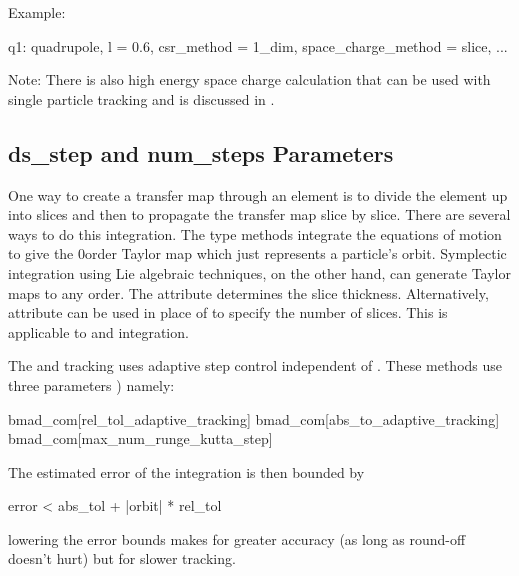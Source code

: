 Example:
\begin{example}
  q1: quadrupole, l = 0.6, csr_method = 1_dim, space_charge_method = slice, ...
\end{example}

Note: There is also high energy space charge calculation that can be used with single particle
tracking and is discussed in .

\subsection{ds_step and num_steps Parameters}
\label{s:ds.step}

One way to create a transfer map through an element is to divide the
element up into slices and then to propagate the transfer map slice by
slice.  There are several ways to do this integration. The
 type methods integrate the equations of motion to
give the 0\Th order Taylor map which just represents a particle's
orbit.  Symplectic integration using Lie
algebraic techniques, on the other hand, can generate Taylor maps to
any order.  The  attribute determines the slice thickness.
Alternatively,  attribute can be used in place of
 to specify the number of slices.
This is applicable to  and
 integration.

The  and  tracking uses adaptive step
control independent of . These methods use three  parameters
) namely:
\begin{example}
  bmad_com[rel_tol_adaptive_tracking]
  bmad_com[abs_to_adaptive_tracking]
  bmad_com[max_num_runge_kutta_step]
\end{example}
The estimated error of the integration is then bounded by
\begin{example}
  error < abs_tol + |orbit| * rel_tol
\end{example}
lowering the error bounds makes for greater accuracy (as long as round-off 
doesn't hurt) but for slower tracking. 

